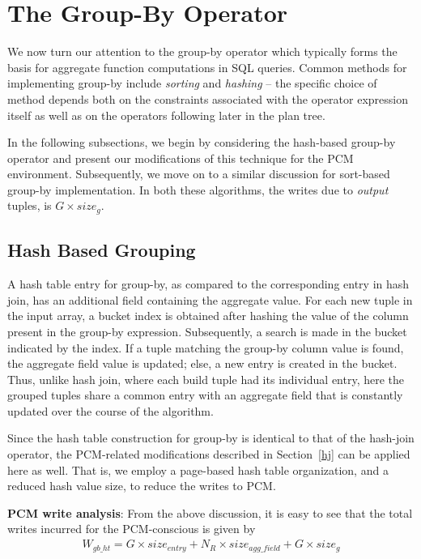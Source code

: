 \section{The Group-By Operator}%
\label{gby}
We now turn our attention to the group-by operator which typically
forms the basis for aggregate function computations in SQL queries.
Common methods for implementing group-by include \textit{sorting} and
\textit{hashing} -- the specific choice of method depends both on the
constraints associated with the operator expression itself as well as
on the operators following later in the plan tree.

In the following subsections, we begin by considering the hash-based
group-by operator and present our modifications of this technique for
the PCM environment. Subsequently, we move on to a similar discussion
for sort-based group-by implementation. In both these algorithms, the writes due to \emph{output} tuples, is $G \times size_g$.

\subsection{Hash Based Grouping}

A hash table entry for group-by, as compared to the corresponding
entry in hash join, has an additional field containing the aggregate
value. For each new tuple in the input array, a bucket index is
obtained after hashing the value of the column present in the group-by
expression. Subsequently, a search is made in the bucket indicated by
the index. If a tuple matching the group-by column value is found, the
aggregate field value is updated; else, a new entry is created in the
bucket. Thus, unlike hash join, where each build tuple had its individual
entry, here the grouped tuples share a common entry with an aggregate
field that is constantly updated over the course of the algorithm.

Since the hash table construction for group-by is identical to that
of the hash-join operator, the PCM-related modifications described
in Section~\ref{hj} can be applied here as well. That is, we employ
a page-based hash table organization, and a reduced hash value size,
to reduce the writes to PCM.

\textbf{PCM write analysis}: From the above discussion, it is easy to see
that the total writes incurred for the PCM-conscious is given by
\begin{equation}
\begin{split}
W_{gb\_ht} = G \times size_{entry} + 
N_R \times size_{agg\_field} + G \times size_g
\end{split}
\end{equation}

